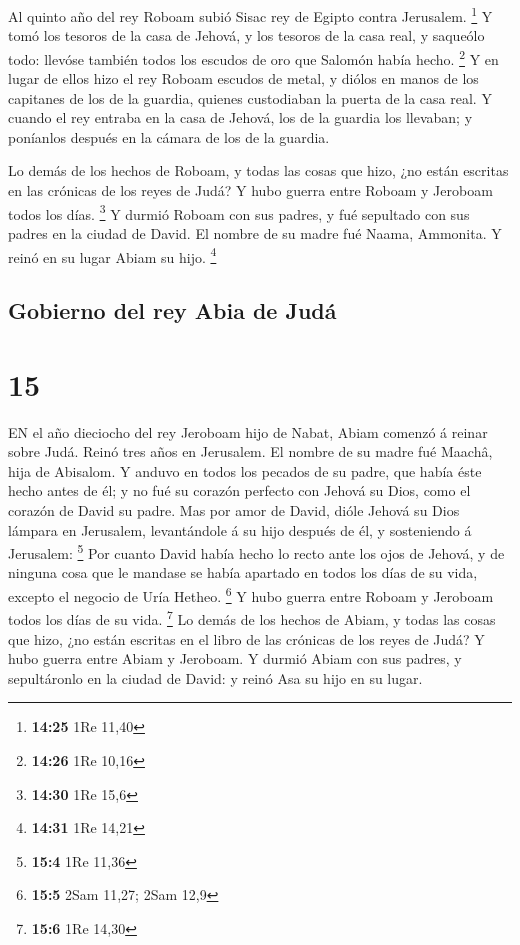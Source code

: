  Al quinto año del rey Roboam subió Sisac rey de Egipto
contra Jerusalem. \footnote{\textbf{14:25} 1Re 11,40}  Y
tomó los tesoros de la casa de Jehová, y los tesoros de la casa real, y
saqueólo todo: llevóse también todos los escudos de oro que Salomón
había hecho. \footnote{\textbf{14:26} 1Re 10,16}  Y en
lugar de ellos hizo el rey Roboam escudos de metal, y diólos en manos de
los capitanes de los de la guardia, quienes custodiaban la puerta de la
casa real.  Y cuando el rey entraba en la casa de Jehová,
los de la guardia los llevaban; y poníanlos después en la cámara de los
de la guardia.

 Lo demás de los hechos de Roboam, y todas las cosas que
hizo, ¿no están escritas en las crónicas de los reyes de Judá?
 Y hubo guerra entre Roboam y Jeroboam todos los días.
\footnote{\textbf{14:30} 1Re 15,6}  Y durmió Roboam con sus
padres, y fué sepultado con sus padres en la ciudad de David. El nombre
de su madre fué Naama, Ammonita. Y reinó en su lugar Abiam su hijo.
\footnote{\textbf{14:31} 1Re 14,21}

\hypertarget{gobierno-del-rey-abia-de-juduxe1}{%
\subsection{Gobierno del rey Abia de
Judá}\label{gobierno-del-rey-abia-de-juduxe1}}

\hypertarget{section-14}{%
\section{15}\label{section-14}}

 EN el año dieciocho del rey Jeroboam hijo de Nabat, Abiam
comenzó á reinar sobre Judá.  Reinó tres años en Jerusalem.
El nombre de su madre fué Maachâ, hija de Abisalom.  Y
anduvo en todos los pecados de su padre, que había éste hecho antes de
él; y no fué su corazón perfecto con Jehová su Dios, como el corazón de
David su padre.  Mas por amor de David, dióle Jehová su Dios
lámpara en Jerusalem, levantándole á su hijo después de él, y
sosteniendo á Jerusalem: \footnote{\textbf{15:4} 1Re 11,36} 
Por cuanto David había hecho lo recto ante los ojos de Jehová, y de
ninguna cosa que le mandase se había apartado en todos los días de su
vida, excepto el negocio de Uría Hetheo. \footnote{\textbf{15:5} 2Sam
  11,27; 2Sam 12,9}  Y hubo guerra entre Roboam y Jeroboam
todos los días de su vida. \footnote{\textbf{15:6} 1Re 14,30}
 Lo demás de los hechos de Abiam, y todas las cosas que
hizo, ¿no están escritas en el libro de las crónicas de los reyes de
Judá? Y hubo guerra entre Abiam y Jeroboam.  Y durmió Abiam
con sus padres, y sepultáronlo en la ciudad de David: y reinó Asa su
hijo en su lugar.

